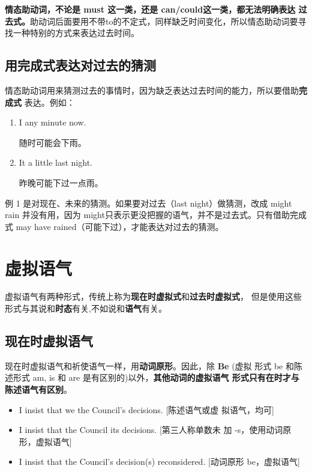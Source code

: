 \textbf{情态助动词，不论是 must 这一类，还是 can/could这一类，都无法明确表达
  过去式。}助动词后面要用不带to的不定式，同样缺乏时间变化，所以情态助动词要寻
找一种特别的方式来表达过去时间。

\subsection{用完成式表达对过去的猜测}

情态助动词用来猜测过去的事情时，因为缺乏表达过去时间的能力，所以要借助\textbf{完成式}
表达。例如：
\begin{enumerate}
\item  I  any minute now.

  随时可能会下雨。
\item  It  a little last night.

  昨晚可能下过一点雨。
\end{enumerate}
例 1 是对现在、未来的猜测。如果要对过去（last night）做猜测，改成 might rain
并没有用，因为 might只表示更没把握的语气，并不是过去式。只有借助完成式 may
have rained（可能下过），才能表达对过去的猜测。

\section{虚拟语气}

虚拟语气有两种形式，传统上称为\textbf{现在时虚拟式}和\textbf{过去时虚拟式}，
但是使用这些形式与其说和\textbf{时态}有关,不如说和\textbf{语气}有关。

\subsection{现在时虚拟语气}

现在时虚拟语气和祈使语气一样，用\textbf{动词原形}。因此，除 \textbf{Be} (虚拟
形式 be 和陈述形式 am, is 和 are 是有区别的)以外，\textbf{其他动词的虚拟语气
  形式只有在}\textbf{时才与陈述语气有区别}。

\begin{itemize}
\item I insist that we  the Council's decisions. [陈述语气或虚
  拟语气，均可]
\item I insist that the Council  its decisions. [第三人称单数未
  加 -s，使用动词原形，虚拟语气]
\item I insist that the Council's decision(s)  reconsidered. [动词原形
  be，虚拟语气]
\end{itemize}

